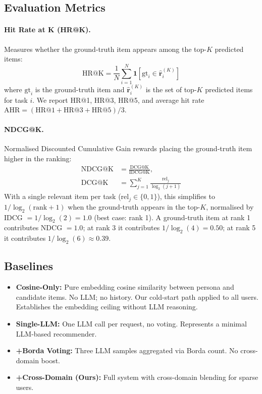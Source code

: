 \documentclass[11pt]{article}
\begin{document}
\subsection{Evaluation Metrics}

\paragraph{Hit Rate at K (HR@K).}
Measures whether the ground-truth item appears among the top-$K$ predicted items:
\begin{equation}
\text{HR@K} = \frac{1}{N}\sum_{i=1}^{N}
  \mathbf{1}\!\left[\text{gt}_i \in \hat{\mathbf{r}}_i^{(K)}\right]
\label{eq:hr}
\end{equation}
where $\text{gt}_i$ is the ground-truth item and $\hat{\mathbf{r}}_i^{(K)}$
is the set of top-$K$ predicted items for task $i$.
We report HR@1, HR@3, HR@5, and average hit rate
$\text{AHR} = (\text{HR@1} + \text{HR@3} + \text{HR@5}) / 3$.

\paragraph{NDCG@K.}
Normalised Discounted Cumulative Gain rewards placing the ground-truth item
higher in the ranking:
\begin{equation}
\begin{aligned}
\text{NDCG@K} &= \frac{\text{DCG@K}}{\text{IDCG@K}},\\
\text{DCG@K}  &= \sum_{j=1}^{K} \frac{\text{rel}_j}{\log_2(j+1)}
\end{aligned}
\label{eq:ndcg}
\end{equation}
With a single relevant item per task ($\text{rel}_j \in \{0,1\}$), this
simplifies to $1/\log_2(\text{rank}+1)$ when the ground-truth appears in the
top-$K$, normalised by IDCG $= 1/\log_2(2) = 1.0$ (best case: rank 1).
A ground-truth item at rank 1 contributes NDCG $= 1.0$; at rank 3 it
contributes $1/\log_2(4) = 0.50$; at rank 5 it contributes
$1/\log_2(6) \approx 0.39$.

\subsection{Baselines}

\begin{itemize}
  \item \textbf{Cosine-Only:} Pure embedding cosine similarity between persona
    and candidate items. No LLM; no history. Our cold-start path applied to all
    users. Establishes the embedding ceiling without LLM reasoning.
  \item \textbf{Single-LLM:} One LLM call per request, no voting.
    Represents a minimal LLM-based recommender.
  \item \textbf{+Borda Voting:} Three LLM samples aggregated via Borda count.
    No cross-domain boost.
  \item \textbf{+Cross-Domain (Ours):} Full system with cross-domain blending
    for sparse users.
\end{itemize}
\end{document}
